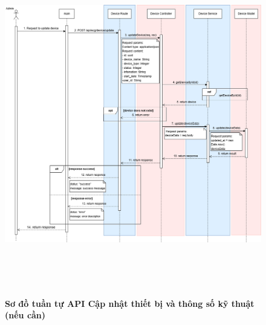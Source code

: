 \begin{figure}[H]
	\centering
	\includegraphics[width=15cm,height=15cm]{Images/api_sequence/device/device-updateDevice.drawio.png}
	\caption[Sơ đồ tuần tự API cập nhật thiết bị và thông số kỹ thuật (nếu cần)]{\bfseries \fontsize{12pt}{0pt}\selectfont Sơ đồ tuần tự API Cập nhật thiết bị và thông số kỹ thuật (nếu cần)}
	\label{sequence_diagram_update_device}
\end{figure}

